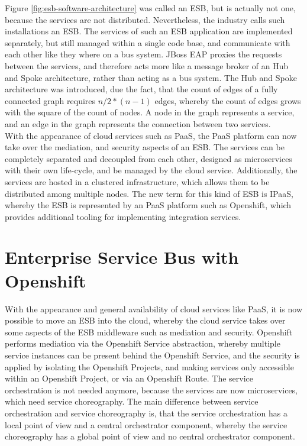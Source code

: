 Figure \vref{fig:esb-software-architecture} was called an ESB, but is actually not one, because the services are not distributed. Nevertheless, the industry calls such installations an ESB. The services of such an ESB application are implemented separately, but still managed within a single code base, and communicate with each other like they where on a bus system. JBoss EAP proxies the requests between the services, and therefore acts more like a message broker of an Hub and Spoke architecture, rather than acting as a bus system. The Hub and Spoke architecture was introduced, due the fact, that the count of edges of a fully connected graph requires $n / 2 * (n -1)$ edges, whereby the count of edges grows with the square of the count of nodes. A node in the graph represents a service, and an edge in the graph represents the connection between two services\cite{EIP,HubAndSpoke2003}. \\

With the appearance of cloud services such as PaaS, the PaaS platform can now take over the mediation, and security aspects of an ESB. The services can be completely separated and decoupled from each other, designed as microservices with their own life-cycle, and be managed by the cloud service. Additionally, the services are hosted in a clustered infrastructure, which allows them to be distributed among multiple nodes. The new term for this kind of ESB is IPaaS, whereby the ESB is represented by an PaaS platform such as Openshift, which provides additional tooling for implementing integration  services\cite{iPaaSP12015, iPaaSP22015}.

\section{Enterprise Service Bus with Openshift}
\label{sec:esb-as-cloud}
With the appearance and general availability of cloud services like PaaS, it is now possible to move an ESB into the cloud, whereby the cloud service takes over some aspects of the ESB middleware such as mediation and security. Openshift performs mediation via the Openshift Service abstraction, whereby multiple service instances can be present behind the Openshift Service, and the security is applied by isolating the Openshift Projects, and making services only accessible within an Openshift Project, or via an Openshift Route. The service orchestration is not needed anymore, because the services are now microservices, which need service choreography. The main difference between service orchestration and service choreography is, that the service orchestration has a local point of view and a central orchestrator component, whereby the service choreography has a global point of view and no central orchestrator component\cite{Richards2015}. \\

